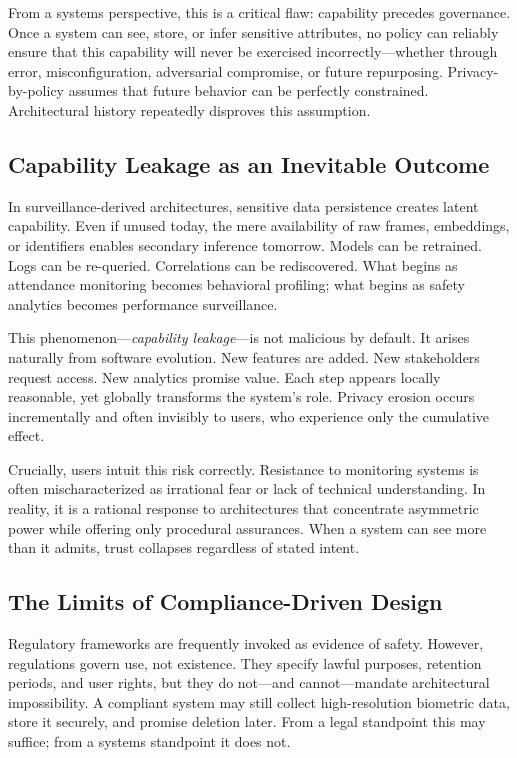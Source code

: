 \documentclass[conference]{IEEEtran}
\begin{document}
From a systems perspective, this is a critical flaw: capability precedes governance. Once a system can see, store, or infer sensitive attributes, no policy can reliably ensure that this capability will never be exercised incorrectly---whether through error, misconfiguration, adversarial compromise, or future repurposing. Privacy-by-policy assumes that future behavior can be perfectly constrained. Architectural history repeatedly disproves this assumption.

\subsection{Capability Leakage as an Inevitable Outcome}
In surveillance-derived architectures, sensitive data persistence creates latent capability. Even if unused today, the mere availability of raw frames, embeddings, or identifiers enables secondary inference tomorrow. Models can be retrained. Logs can be re-queried. Correlations can be rediscovered. What begins as attendance monitoring becomes behavioral profiling; what begins as safety analytics becomes performance surveillance.

This phenomenon---\textit{capability leakage}---is not malicious by default. It arises naturally from software evolution. New features are added. New stakeholders request access. New analytics promise value. Each step appears locally reasonable, yet globally transforms the system's role. Privacy erosion occurs incrementally and often invisibly to users, who experience only the cumulative effect.

Crucially, users intuit this risk correctly. Resistance to monitoring systems is often mischaracterized as irrational fear or lack of technical understanding. In reality, it is a rational response to architectures that concentrate asymmetric power while offering only procedural assurances. When a system can see more than it admits, trust collapses regardless of stated intent.

\subsection{The Limits of Compliance-Driven Design}
Regulatory frameworks are frequently invoked as evidence of safety. However, regulations govern use, not existence. They specify lawful purposes, retention periods, and user rights, but they do not---and cannot---mandate architectural impossibility. A compliant system may still collect high-resolution biometric data, store it securely, and promise deletion later. From a legal standpoint this may suffice; from a systems standpoint it does not.
\end{document}
